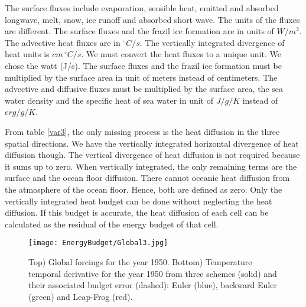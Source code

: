 The surface fluxes include evaporation, sensible heat, emitted and absorbed longwave, melt, snow, ice runoff and absorbed short wave. The units of the fluxes are different. The surface fluxes and the frazil ice formation are in units of $W/m^2$. The advective heat fluxes are in $^\circ C/s$. The vertically integrated divergence of heat units is  $cm \, ^\circ C/s$. We must convert the heat fluxes to a unique unit. We chose the watt (J/s). The surface fluxes and the frazil ice formation must be multiplied by the surface area in unit of meters instead of centimeters. The advective and diffusive fluxes must be multiplied by the surface area, the sea water density and the specific heat of sea water in unit of $J/g/K$ instead of $erg/g/K$. 

From table \ref{var3}, the only missing process is the heat diffusion in the three spatial directions. We have the vertically integrated horizontal divergence of heat diffusion though. The vertical divergence of heat diffusion is not required because it sums up to zero. When vertically integrated, the only remaining terms are the surface  and the ocean floor diffusion. There cannot oceanic heat diffusion from the atmosphere of the ocean floor. Hence, both are defined as zero. Only the vertically integrated heat budget can be done without neglecting the heat diffusion. If this budget is accurate, the heat diffusion of each cell can be calculated as the residual of the energy budget of that cell.

\begin{figure}[b!]
\center
\texttt{[image: EnergyBudget/Global3.jpg]}
\caption{ Top) Global forcings for the year 1950. Bottom) Temperature temporal derivative for the year 1950 from three schemes (solid) and their associated budget error (dashed): Euler (blue), backward Euler (green) and Leap-Frog (red).}
\label{G3}
\end{figure}

